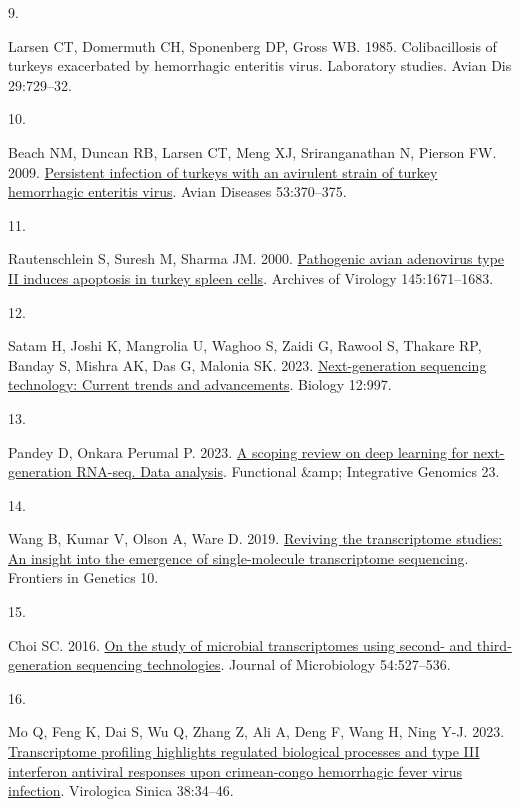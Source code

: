 \documentclass[
]{article}
\newlength{\cslhangindent}
\newlength{\csllabelwidth}
\newenvironment{CSLReferences}[2] %
 {\begin{list}{}{%
  \setlength{\itemindent}{0pt}
  \setlength{\leftmargin}{0pt}
  \setlength{\parsep}{0pt}
  \ifodd #1
   \setlength{\leftmargin}{\cslhangindent}
   \setlength{\itemindent}{-1\cslhangindent}
  \fi
  \setlength{\itemsep}{#2\baselineskip}}}
 {\end{list}}
\newcommand{\CSLLeftMargin}[1]{\parbox[t]{\csllabelwidth}{\strut#1\strut}}
\newcommand{\CSLRightInline}[1]{\parbox[t]{\linewidth - \csllabelwidth}{\strut#1\strut}}
\begin{document}
\begin{CSLReferences}{0}{1}
\CSLLeftMargin{9. }%
\CSLRightInline{Larsen CT, Domermuth CH, Sponenberg DP, Gross WB. 1985.
Colibacillosis of turkeys exacerbated by hemorrhagic enteritis virus.
Laboratory studies. Avian Dis 29:729--32.}

\CSLLeftMargin{10. }%
\CSLRightInline{Beach NM, Duncan RB, Larsen CT, Meng XJ, Sriranganathan
N, Pierson FW. 2009.
\href{https://doi.org/10.1637/8575-010509-reg.1}{Persistent infection of
turkeys with an avirulent strain of turkey hemorrhagic enteritis virus}.
Avian Diseases 53:370--375.}

\CSLLeftMargin{11. }%
\CSLRightInline{Rautenschlein S, Suresh M, Sharma JM. 2000.
\href{https://doi.org/10.1007/s007050070083}{Pathogenic avian adenovirus
type II induces apoptosis in turkey spleen cells}. Archives of Virology
145:1671--1683.}

\CSLLeftMargin{12. }%
\CSLRightInline{Satam H, Joshi K, Mangrolia U, Waghoo S, Zaidi G, Rawool
S, Thakare RP, Banday S, Mishra AK, Das G, Malonia SK. 2023.
\href{https://doi.org/10.3390/biology12070997}{Next-generation
sequencing technology: Current trends and advancements}. Biology
12:997.}

\CSLLeftMargin{13. }%
\CSLRightInline{Pandey D, Onkara Perumal P. 2023.
\href{https://doi.org/10.1007/s10142-023-01064-6}{A scoping review on
deep learning for next-generation RNA-seq. Data analysis}. Functional
\&amp; Integrative Genomics 23.}

\CSLLeftMargin{14. }%
\CSLRightInline{Wang B, Kumar V, Olson A, Ware D. 2019.
\href{https://doi.org/10.3389/fgene.2019.00384}{Reviving the
transcriptome studies: An insight into the emergence of single-molecule
transcriptome sequencing}. Frontiers in Genetics 10.}

\CSLLeftMargin{15. }%
\CSLRightInline{Choi SC. 2016.
\href{https://doi.org/10.1007/s12275-016-6233-2}{On the study of
microbial transcriptomes using second- and third-generation sequencing
technologies}. Journal of Microbiology 54:527--536.}

\CSLLeftMargin{16. }%
\CSLRightInline{Mo Q, Feng K, Dai S, Wu Q, Zhang Z, Ali A, Deng F, Wang
H, Ning Y-J. 2023.
\href{https://doi.org/10.1016/j.virs.2022.09.002}{Transcriptome
profiling highlights regulated biological processes and type III
interferon antiviral responses upon crimean-congo hemorrhagic fever
virus infection}. Virologica Sinica 38:34--46.}


\end{CSLReferences}
\end{document}
